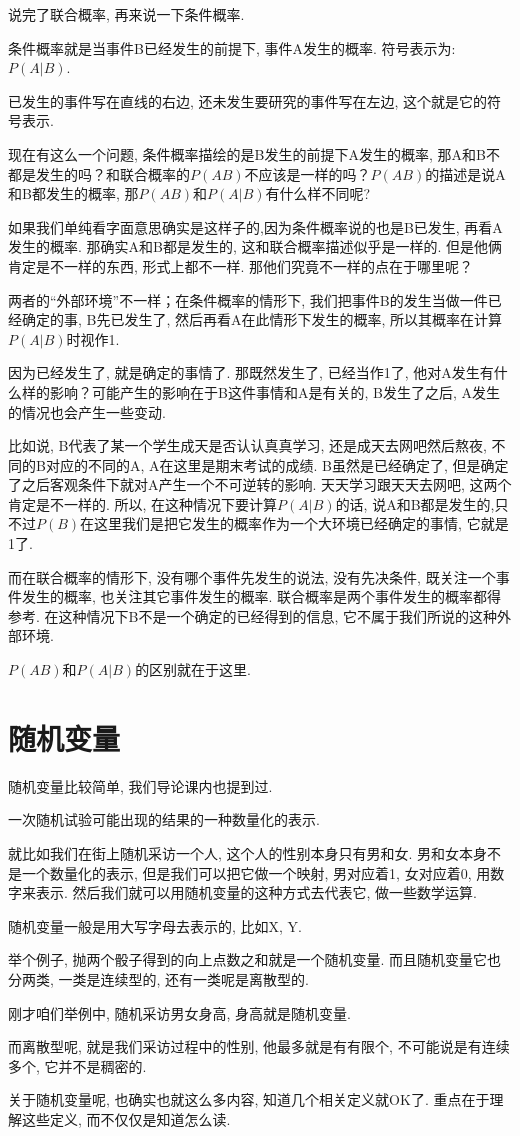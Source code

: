说完了联合概率, 再来说一下条件概率. 

条件概率就是当事件B已经发生的前提下, 事件A发生的概率. 符号表示为: $P(A|B)$. 

已发生的事件写在直线的右边, 还未发生要研究的事件写在左边, 这个就是它的符号表示. 

现在有这么一个问题, 条件概率描绘的是B发生的前提下A发生的概率, 那A和B不都是发生的吗？和联合概率的$P(AB)$不应该是一样的吗？$P(AB)$的描述是说A和B都发生的概率, 那$P(AB)$和$P(A|B)$有什么样不同呢?

如果我们单纯看字面意思确实是这样子的,因为条件概率说的也是B已发生, 再看A发生的概率. 那确实A和B都是发生的, 这和联合概率描述似乎是一样的. 但是他俩肯定是不一样的东西, 形式上都不一样. 那他们究竟不一样的点在于哪里呢？

两者的“外部环境”不一样；在条件概率的情形下, 我们把事件B的发生当做一件已经确定的事, B先已发生了, 然后再看A在此情形下发生的概率, 所以其概率在计算$P(A|B)$时视作1. 

因为已经发生了, 就是确定的事情了. 那既然发生了, 已经当作1了, 他对A发生有什么样的影响？可能产生的影响在于B这件事情和A是有关的, B发生了之后, A发生的情况也会产生一些变动. 

比如说, B代表了某一个学生成天是否认认真真学习, 还是成天去网吧然后熬夜, 不同的B对应的不同的A, A在这里是期末考试的成绩. B虽然是已经确定了, 但是确定了之后客观条件下就对A产生一个不可逆转的影响. 天天学习跟天天去网吧, 这两个肯定是不一样的. 所以, 在这种情况下要计算$P(A|B)$的话, 说A和B都是发生的,只不过$P(B)$在这里我们是把它发生的概率作为一个大环境已经确定的事情, 它就是1了. 

而在联合概率的情形下, 没有哪个事件先发生的说法, 没有先决条件, 既关注一个事件发生的概率, 也关注其它事件发生的概率. 联合概率是两个事件发生的概率都得参考. 在这种情况下B不是一个确定的已经得到的信息, 它不属于我们所说的这种外部环境. 

$P(AB)$和$P(A|B)$的区别就在于这里. 

\section{随机变量}

随机变量比较简单, 我们导论课内也提到过. 

一次随机试验可能出现的结果的一种数量化的表示. 

就比如我们在街上随机采访一个人, 这个人的性别本身只有男和女. 男和女本身不是一个数量化的表示, 但是我们可以把它做一个映射, 男对应着1, 女对应着0, 用数字来表示. 然后我们就可以用随机变量的这种方式去代表它, 做一些数学运算. 

随机变量一般是用大写字母去表示的, 比如X, Y. 

举个例子, 抛两个骰子得到的向上点数之和就是一个随机变量. 而且随机变量它也分两类, 一类是连续型的, 还有一类呢是离散型的. 

刚才咱们举例中, 随机采访男女身高, 身高就是随机变量. 

而离散型呢, 就是我们采访过程中的性别, 他最多就是有有限个, 不可能说是有连续多个, 它并不是稠密的. 

关于随机变量呢, 也确实也就这么多内容, 知道几个相关定义就OK了. 重点在于理解这些定义, 而不仅仅是知道怎么读. 
